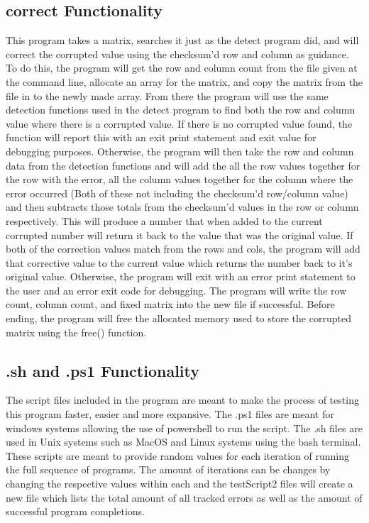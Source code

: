 \documentclass{article}
\begin{document}
\begin{multicols}{2}
    \subsection{correct Functionality}\label{subsec:correctFunc}
    This program takes a matrix, searches it just as the detect program did, and will correct the corrupted value using the checksum'd row and column as guidance. To do this,
    the program will get the row and column count from the file given at the command line, allocate an array for the matrix, and copy the matrix from the file in to the
    newly made array. From there the program will use the same detection functions used in the detect program to find both the row and column value where there is a corrupted
    value. If there is no corrupted value found, the function will report this with an exit print statement and exit value for debugging purposes. Otherwise, the program will
    then take the row and column data from the detection functions and will add the all the row values together for the row with the error, all the column values together for
    the column where the error occurred (Both of these not including the checksum'd row/column value) and then subtracts those totals from the checksum'd values in the row or column
    respectively. This will produce a number that when added to the current corrupted number will return it back to the value that was the original value. If both of the correction
    values match from the rows and cols, the program will add that corrective value to the current value which returns the number back to it's original value. Otherwise, the
    program will exit with an error print statement to the user and an error exit code for debugging. The program will write the row count, column count, and fixed matrix into
    the new file if successful. Before ending, the program will free the allocated memory used to store the corrupted matrix using the free() function.
    \subsection{.sh and .ps1 Functionality}\label{subsec:shPs1Func}
    The script files included in the program are meant to make the process of testing this program faster, easier and more expansive. The .ps1 files are meant for windows systems
    allowing the use of powershell to run the script. The .sh files are used in Unix systems such as MacOS and Linux systems using the bash terminal. These scripts are meant to provide
    random values for each iteration of running the full sequence of programs. The amount of iterations can be changes by changing the respective values within each and the
    testScript2 files will create a new file which lists the total amount of all tracked errors as well as the amount of successful program completions. 


\end{multicols}
\end{document}
